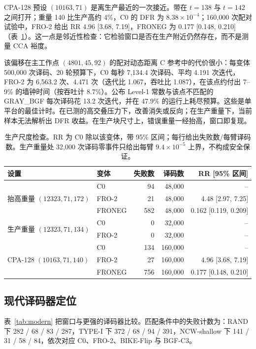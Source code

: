 \documentclass[UTF8,a4paper,10pt,onecolumn]{ctexart}
\begin{document}
CPA-128 预设 $(10163,71)$ 是离生产最近的一次接近。带在 $t=138$ 与 $t=142$ 之间打开；重量 140 比生产高约 4\%，C0 的 DFR 为 $8.38\times10^{-4}$；160{,}000 次配对试验中，FRO-2 给出 RR 4.96 [3.68, 7.19]，FRONEG 为 0.177 [0.148, 0.210]（表~\ref{tab:added}）。这一点是邻近性检查：它检验窗口是否在生产附近仍然存在，而不是测量 CCA 裕度。

该偏移在主工作点 $(4801,45,92)$ 的配对动态距离 C 参考中的代价很小：每变体 500{,}000 次译码、20 轮预算下，C0 每秒 7{,}134.4 次译码、平均 4.191 次迭代，FRO-2 为 6{,}563.2 次、4.471 次（迭代比 1.067，吞吐比 1.087），在该点约付出 7--9\% 的墙钟时间（按吞吐计 8.7\%）。公布 Level-1 常数与该点不匹配的 GRAY\_BGF 每次译码花 13.2 次迭代，并在 47.9\% 的运行上耗尽预算。这些是单平台的最佳计时。在已测的高交叠压力下，改善消失或反向；在生产重量下，当前样本无法解析出 DFR 收益。在生产块尺寸上，错误重量一经抬高，窗口即复现。

\begin{table}[!t]
\centering
\small
\caption{生产尺度检查。RR 为 C0 除以该变体，带 95\% 区间；每行给出失败数/每臂译码数。生产重量处 32{,}000 次译码零事件只给出每臂 $9.4\times10^{-5}$ 上界，不构成安全保证。}
\label{tab:added}
\begin{tabular}{llrrr}
\toprule
设置 & 变体 & 失败数 & 译码数 & RR [95\% 区间] \\
\midrule
\multirow{3}{*}{抬高重量 $(12323,71,172)$} & C0 & 94 & 48{,}000 & -- \\
 & FRO-2 & 21 & 48{,}000 & 4.48 [2.97, 7.25] \\
 & FRONEG & 582 & 48{,}000 & 0.162 [0.119, 0.209] \\
\midrule
\multirow{2}{*}{生产重量 $(12323,71,134)$} & C0 & 0 & 32{,}000 & -- \\
 & FRO-2 & 0 & 32{,}000 & -- \\
\midrule
\multirow{3}{*}{CPA-128 $(10163,71,140)$} & C0 & 134 & 160{,}000 & -- \\
 & FRO-2 & 27 & 160{,}000 & 4.96 [3.68, 7.19] \\
 & FRONEG & 756 & 160{,}000 & 0.177 [0.148, 0.210] \\
\bottomrule
\end{tabular}
\end{table}

\subsection{现代译码器定位}\label{sec:modern}

表~\ref{tab:modern} 把窗口与更强的译码器比较。匹配条件中的失败计数为：RAND 下 282 / 68 / 83 / 287，TYPE-I 下 372 / 68 / 94 / 391，NCW-shallow 下 141 / 31 / 58 / 84，依次对应 C0、FRO-2、BIKE-Flip 与 BGF-C3。
\end{document}
